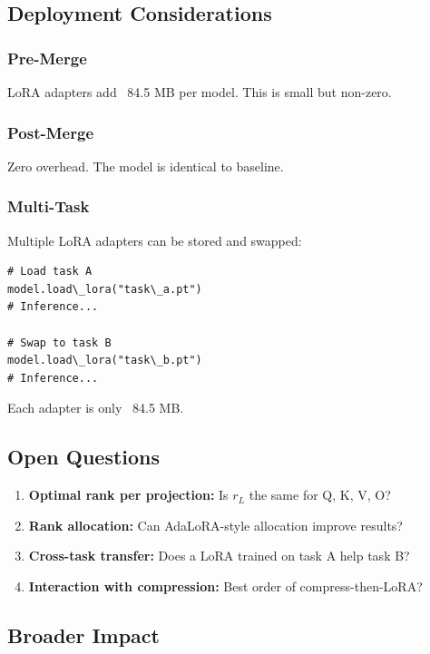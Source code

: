\subsection{Deployment Considerations}

\subsubsection{Pre-Merge}

LoRA adapters add ~84.5 MB per model. This is small but 
non-zero.

\subsubsection{Post-Merge}

Zero overhead. The model is identical to baseline.

\subsubsection{Multi-Task}

Multiple LoRA adapters can be stored and swapped:

\begin{lstlisting}
# Load task A
model.load\_lora("task\_a.pt")
# Inference...

# Swap to task B
model.load\_lora("task\_b.pt")
# Inference...
\end{lstlisting}

Each adapter is only ~84.5 MB.

\subsection{Open Questions}

\begin{enumerate}
\item \textbf{Optimal rank per projection:} Is $r_L$ the same for Q, K, V, O?
\item \textbf{Rank allocation:} Can AdaLoRA-style allocation improve results?
\item \textbf{Cross-task transfer:} Does a LoRA trained on task A help task B?
\item \textbf{Interaction with compression:} Best order of compress-then-LoRA?

\end{enumerate}
\subsection{Broader Impact}

